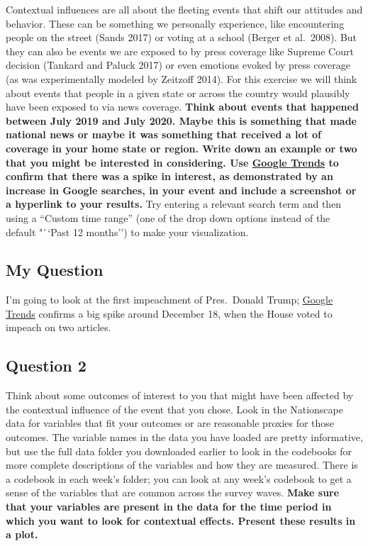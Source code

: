 \documentclass[
]{article}
\begin{document}
Contextual influences are all about the fleeting events that shift our
attitudes and behavior. These can be something we personally experience,
like encountering people on the street (Sands 2017) or voting at a
school (Berger et al.~2008). But they can also be events we are exposed
to by press coverage like Supreme Court decision (Tankard and Paluck
2017) or even emotions evoked by press coverage (as was experimentally
modeled by Zeitzoff 2014). For this exercise we will think about events
that people in a given state or across the country would plausibly have
been exposed to via news coverage. \textbf{Think about events that
happened between July 2019 and July 2020. Maybe this is something that
made national news or maybe it was something that received a lot of
coverage in your home state or region. Write down an example or two that
you might be interested in considering. Use
\href{https://trends.google.com/trends/?geo=US}{Google Trends} to
confirm that there was a spike in interest, as demonstrated by an
increase in Google searches, in your event and include a screenshot or a
hyperlink to your results.} Try entering a relevant search term and then
using a ``Custom time range'' (one of the drop down options instead of
the default "``Past 12 months'') to make your visualization.

\hypertarget{my-question}{%
\subsection{My Question}\label{my-question}}

I'm going to look at the first impeachment of Pres.~Donald Trump;
\href{https://trends.google.com/trends/explore?date=2019-07-01\%202020-07-31\&geo=US\&q=impeachment}{Google
Trends} confirms a big spike around December 18, when the House voted to
impeach on two articles.

\hypertarget{question-2}{%
\subsection{Question 2}\label{question-2}}

Think about some outcomes of interest to you that might have been
affected by the contextual influence of the event that you chose. Look
in the Nationscape data for variables that fit your outcomes or are
reasonable proxies for those outcomes. The variable names in the data
you have loaded are pretty informative, but use the full data folder you
downloaded earlier to look in the codebooks for more complete
descriptions of the variables and how they are measured. There is a
codebook in each week's folder; you can look at any week's codebook to
get a sense of the variables that are common across the survey waves.
\textbf{Make sure that your variables are present in the data for the
time period in which you want to look for contextual effects. Present
these results in a plot.}
\end{document}
